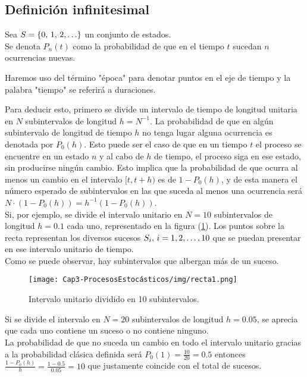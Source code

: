 \subsection{Definición infinitesimal}
    Sea $S=\{0,\thinspace 1,\thinspace 2,\ldots\}$ un conjunto de estados.\\Se denota $P_n(t)$ como la probabilidad de que en el tiempo $t$ sucedan $n$ ocurrencias nuevas.
    \begin{Obs}
    Haremos uso del término "época" para denotar puntos en el eje de tiempo y la palabra "tiempo" se referirá a duraciones.
    \end{Obs}
    Para deducir esto, primero se divide un intervalo de tiempo de longitud unitaria en $N$ subintervalos de longitud $h=N^{-1}$.
    La probabilidad de que en algún subintervalo de longitud de tiempo $h$ no tenga lugar alguna ocurrencia es denotada por $P_0(h)$. 
    Esto puede ser el caso de que en un tiempo $t$ el proceso se encuentre en un estado $n$ y al cabo de $h$ de tiempo, el proceso siga en ese estado, sin producirse ningún cambio. Esto implica que la probabilidad de que ocurra al menos un cambio en el intervalo $[t,t+h)$ es de  $1-P_0(h)$, y de esta manera el número esperado de subintervalos en las que suceda al menos una ocurrencia será $N\cdot(1-P_0(h))=h^{-1}(1-P_0(h))$.
    \\Si, por ejemplo, se divide el intervalo unitario en $N=10$ subintervalos de longitud $h=0.1$ cada uno, representado en la figura (\ref{fig-procesoPoison-recta1}). Los puntos sobre la recta representan los diversos sucesos $S_i,\thinspace i=1,2,\ldots,10$ que se puedan presentar en ese intervalo unitario de tiempo.\\ Como se puede observar, hay subintervalos que albergan más de un suceso.
    \begin{center}
        \begin{figure}[htb]
            \texttt{[image: Cap3-ProcesosEstocásticos/img/recta1.png]}
            \caption{Intervalo unitario dividido en 10 subintervalos.}
            \label{fig-procesoPoison-recta1}
            \vspace*{0.05in}
        \end{figure}
    \end{center}
    Si se divide el intervalo en $N=20$ subintervalos de longitud $h=0.05$, se aprecia que cada uno contiene un suceso o no contiene ninguno.\\
    La probabilidad de que no suceda un cambio en todo el intervalo unitario gracias a la probabilidad clásica definida será $P_0(1)=\frac{10}{20}=0.5$ entonces $\frac{1-P_0(h)}{h}=\frac{1-0.5}{0.05}=10$ que justamente coincide con el total de sucesos.\\
